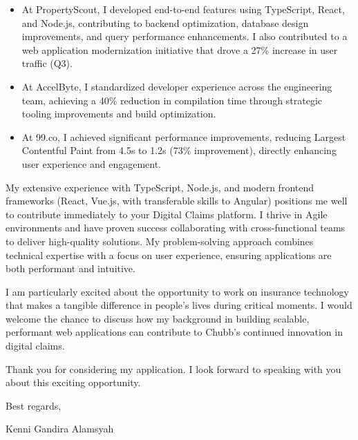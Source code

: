 \documentclass[11pt]{article}
\begin{document}
\begin{itemize}
    \item At PropertyScout, I developed end-to-end features using TypeScript, React, and Node.js, contributing to backend optimization, database design improvements, and query performance enhancements. I also contributed to a web application modernization initiative that drove a 27\% increase in user traffic (Q3).
    \item At AccelByte, I standardized developer experience across the engineering team, achieving a 40\% reduction in compilation time through strategic tooling improvements and build optimization.
    \item At 99.co, I achieved significant performance improvements, reducing Largest Contentful Paint from 4.5s to 1.2s (73\% improvement), directly enhancing user experience and engagement.
\end{itemize}

\vspace{0.5em}

My extensive experience with TypeScript, Node.js, and modern frontend frameworks (React, Vue.js, with transferable skills to Angular) positions me well to contribute immediately to your Digital Claims platform. I thrive in Agile environments and have proven success collaborating with cross-functional teams to deliver high-quality solutions. My problem-solving approach combines technical expertise with a focus on user experience, ensuring applications are both performant and intuitive.

\vspace{0.5em}

I am particularly excited about the opportunity to work on insurance technology that makes a tangible difference in people's lives during critical moments. I would welcome the chance to discuss how my background in building scalable, performant web applications can contribute to Chubb's continued innovation in digital claims.

\vspace{0.5em}

Thank you for considering my application. I look forward to speaking with you about this exciting opportunity.

\vspace{1em}

Best regards,

\vspace{1em}

Kenni Gandira Alamsyah
\end{document}
